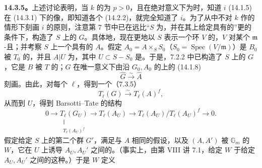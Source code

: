 \textbf{14.3.5。}上述讨论表明，当 $k$ 的为 $p>0$，且在绝对意义下为时，知道 $i$ (14.1.5) 在 (14.3.1) 下的像，即知道各个 (14.2.2)，就完全知道了 $i$。为了从中不对 $k$ 作的情形下刻画 $i$ 的原则，注意第 7 节中已在远比“$S$ 为，并在其上给定具有的”更的条件下，构造了 $S$ 上的 $G$。具体地，现在更地以 $S$ 表示一个环 $V$ 的，$V$ 对某个 $\mathfrak m$-且；并考察 $S$ 上一个具有的 $A$。假定
$A_0=A\times_SS_0$（$S_0=\operatorname{Spec}(V/\mathfrak m)$）是 $B_0$ 被 $T_0$ 的，并且 $A|U$ 为，其中 $U\subset S-S_0$ 是。于是，7.2.2 中已构造了 $S$ 上的 $G$，它是 $B$ 被 $T$ 的；$G$ 在唯一意义下由沿 $G_0,A_0$ 的上的 (14.1.8)
\begin{equation}\tag{14.3.5.1}
\widehat G\xrightarrow\sim\widehat A
\end{equation}
刻画。由此，对每个 $\ell$，得到一个（7.3.5）
\begin{equation}\tag{14.3.5.2}
T_\ell(G)\xrightarrow\sim T_\ell(A)^f,
\end{equation}
从而到 $U$，得到 Barsotti--Tate 的结构
\begin{equation}\tag{14.3.5.3}
0\longrightarrow\underset{\substack{\Vert\\T_\ell(A_U)^f}}{T_\ell(G_U)}
\longrightarrow T_\ell(A_U)\longrightarrow T_\ell(A_U)/T_\ell(A_U)^f\longrightarrow0.
\end{equation}
假定给定 $S$ 上的第二个群 $G'$，满足与 $A$ 相同的假设，以及 $(A,A')$ 被 $\mathbb G_m$ 的 $W$，它在 $U$ 上诱导 $A_U,A_U'$ 之间的。（事实上，由第 VIII 讲 7.1，给定 $W$ 于给定 $A_U,A_U'$ 之间的这种。）于是 $W$ 定义
